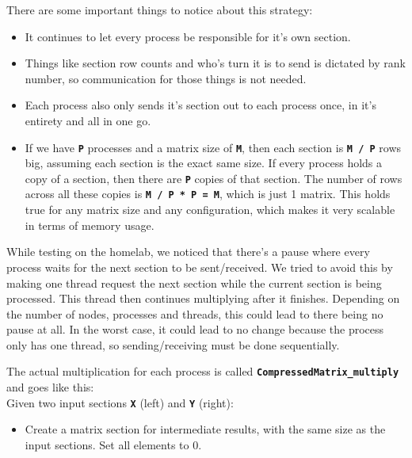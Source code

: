 \documentclass[11pt,leqno]{article}
\providecommand{\tightlist}{%
  \setlength{\itemsep}{0pt}\setlength{\parskip}{0pt}}
\begin{document}
\begin{flushleft}
There are some important things to notice about this strategy:
\begin{itemize}[label=\textcolor{CtpMauve}{\textbullet}]
  \item It continues to let every process be responsible for it's own section.

  \item Things like section row counts and who's turn it is to send is dictated by rank number, so communication for those things is not needed.

  \item Each process also only sends it's section out to each process once, in it's entirety and all in one go.

  \item If we have \textbf{\texttt{P}} processes and a matrix size of \textbf{\texttt{M}}, then each section is \textbf{\texttt{M / P}} rows big, assuming each section is the exact same size. If every process holds a copy of a section, then there are \textbf{\texttt{P}} copies of that section. The number of rows across all these copies is \textbf{\texttt{M / P * P = M}}, which is just 1 matrix. This holds true for any matrix size and any configuration, which makes it very scalable in terms of memory usage.


\end{itemize}
While testing on the homelab, we noticed that there's a pause where
every process waits for the next section to be sent/received. We tried
to avoid this by making one thread request the next section while the
current section is being processed. This thread then continues
multiplying after it finishes. Depending on the number of nodes,
processes and threads, this could lead to there being no pause at all.
In the worst case, it could lead to no change because the process only
has one thread, so sending/receiving must be done sequentially.

The actual multiplication for each process is called
\textbf{\texttt{CompressedMatrix_multiply}} and goes like this: \\[2 ex]

Given two input sections \textbf{\texttt{X}} (left) and \textbf{\texttt{Y}} (right):
\begin{itemize}[label=\textcolor{CtpMauve}{$-$}]
\tightlist
  \item Create a matrix section for intermediate results, with the same size as the input sections. Set all elements to 0.


\end{itemize}
\end{flushleft}
\end{document}
